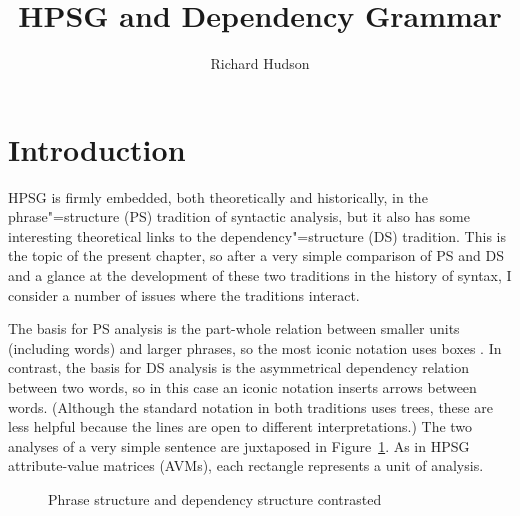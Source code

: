 \documentclass[output=paper
 	        ,biblatex
                ,babelshorthands
                ,newtxmath
                ,draftmode
                ,colorlinks, citecolor=brown
]{langscibook}
\author{Richard Hudson\affiliation{University College London}}
\title{HPSG and Dependency Grammar}
\begin{document}
\maketitle
\label{chap-dg}


\section{Introduction}
\label{sec:1}

HPSG is firmly embedded, both theoretically and historically, in the phrase"=structure (PS) tradition of syntactic analysis, but it also has some interesting theoretical links to the dependency"=structure (DS) tradition. This is the topic of the present chapter, so after a very simple comparison of PS and DS and a glance at the development of these two traditions in the history of syntax, I consider a number of issues where the traditions interact.

The basis for PS analysis is the part-whole relation between smaller units (including words) and larger phrases, so the most iconic notation uses boxes \citep[6]{MuellerGT-Eng2}. In contrast, the basis for DS analysis is the asymmetrical dependency relation between two words, so in this case an iconic notation inserts arrows between words. (Although the standard notation in both traditions uses trees, these are less helpful because the lines are open to different interpretations.) The two analyses of a very simple sentence are juxtaposed in Figure~\ref{fig:1}. As in HPSG attribute-value matrices (AVMs), each rectangle represents a unit of analysis.

\begin{figure}
  \centering

\vspace{\baselineskip}

%
	\caption{Phrase structure and dependency structure contrasted}
	\label{fig:1}
\end{figure}
\end{document}
